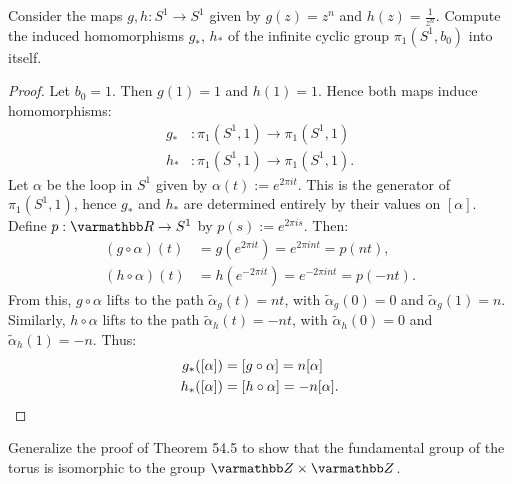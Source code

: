 \documentclass[10pt,oneside,openany]{memoir}
\begin{document}
	\begin{exercise}[manual-num={6}]
	Consider the maps $g,h:S^1 \rightarrow S^1$ given by $g(z) = z^n$ and $h(z) = \frac{1}{z^n}$. Compute the induced homomorphisms $g_\ast$, $h_\ast$ of the infinite cyclic group $\pi_1(S^1,b_0)$ into itself.
\end{exercise}
	\begin{proof}
		Let $b_0=1$. Then $g(1) = 1$ and $h(1) = 1$. Hence both maps induce homomorphisms:
		\begin{align*}
			g_\ast &:\pi_1(S^1,1) \rightarrow \pi_1(S^1,1) \\
			h_\ast &:\pi_1(S^1,1) \rightarrow \pi_1(S^1,1).
		\end{align*}
		Let $\alpha$ be the loop in $S^1$ given by $\alpha(t) := e^{2 \pi i t}$. This is the generator of $\pi_1(S^1,1)$, hence $g_\ast$ and $h_\ast$ are determined entirely by their values on $[\alpha]$. Define $p:\bfR \rightarrow S^1$ by $p(s) := e^{2\pi i s}$. Then:
		\begin{align*}
			(g \circ \alpha)(t) &= g(e^{2 \pi i t}) = e^{2 \pi i n t} = p(nt), \\
			(h \circ \alpha)(t) &= h(e^{-2 \pi i t}) = e^{-2 \pi i n t} = p(-nt).
		\end{align*}
		From this, $g \circ \alpha$ lifts to the path $\tilde{\alpha}_g(t) = nt$, with $\tilde{\alpha}_g(0) = 0$ and $\tilde{\alpha}_g(1) = n$. Similarly, $h \circ \alpha$ lifts to the path $\tilde{\alpha}_h(t) = -nt$, with $\tilde{\alpha}_h(0) = 0$ and $\tilde{\alpha}_h(1) = -n$. Thus:
		\begin{align*}
			g_\ast([\alpha]) &= [g \circ \alpha] = n [\alpha] \\
			h_\ast([\alpha]) &= [h \circ \alpha] = -n[\alpha]. \qedhere
		\end{align*}
	\end{proof}
\begin{exercise}[manual-num={7}]
	Generalize the proof of Theorem 54.5 to show that the fundamental group of the torus is isomorphic to the group $\bfZ \times \bfZ$.
\end{exercise}
\end{document}
